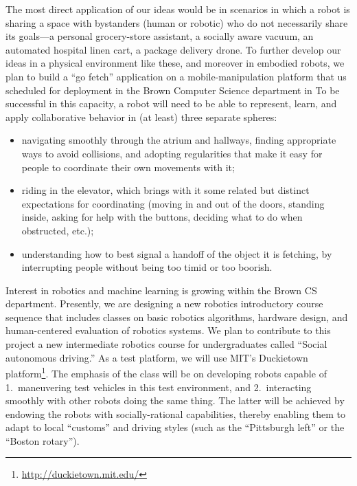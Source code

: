 The most direct application of our ideas would be in scenarios in
which a robot is sharing a space with bystanders (human or robotic)
who do not necessarily share its goals---a personal grocery-store
assistant, a socially aware vacuum, an automated hospital linen cart,
a package delivery drone.  To further develop our ideas in a physical
environment like these, and moreover in embodied robots,
we plan to build a ``go fetch'' application on a mobile-manipulation
platform that us scheduled for deployment in the Brown Computer Science department in 
To be successful in this capacity, a robot will need to be able to
represent, learn, and apply collaborative behavior in (at least) three
separate spheres:

\begin{itemize}
\item navigating smoothly through the atrium and hallways, finding
  appropriate ways to avoid collisions, and adopting regularities that
  make it easy for people to coordinate their own movements with it;

\item riding in the elevator, which brings with it some related but
  distinct expectations for coordinating (moving in and out of the
  doors, standing inside, asking for help with the buttons, deciding
  what to do when obstructed, etc.);

\item understanding how to best signal a handoff of the object it is
  fetching, by interrupting people without being too timid or too
  boorish.
\end{itemize}


Interest in robotics and machine learning is growing within the Brown CS department.  
Presently, we are designing a new robotics
introductory course sequence that includes classes on basic robotics
algorithms, hardware design, and human-centered evaluation of robotics
systems.  We plan to contribute to this project a new intermediate
robotics course for undergraduates called ``Social autonomous
driving.''  As a test platform, we will use MIT's Duckietown
platform\footnote{\url{http://duckietown.mit.edu/}}.  The emphasis of 
the class will be on developing robots capable of 1.~maneuvering test
vehicles in this test environment, and 2.~interacting smoothly with
other robots doing the same thing.  The latter will be achieved by
endowing the robots with socially-rational capabilities, thereby
enabling them to adapt to local ``customs'' and driving styles (such
as the ``Pittsburgh left'' or the ``Boston rotary'').

